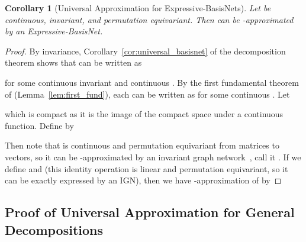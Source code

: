 \documentclass{article} \usepackage{iclr2023_conference,times}
\newtheorem{corollary}{Corollary}
\begin{document}
\begin{corollary}[Universal Approximation for Expressive-BasisNets]
    Let  be continuous,  invariant, and permutation equivariant. Then  can be -approximated by an Expressive-BasisNet.
\end{corollary}
\begin{proof}
    By invariance, Corollary~\ref{cor:universal_basisnet} of the decomposition theorem shows that  can be written as 
    
    for some continuous  invariant  and continuous . By the first fundamental theorem of  (Lemma~\ref{lem:first_fund}), each  can be written as  for some continuous . Let 
    
    which is compact as it is the image of the compact space  under a continuous function.
    Define  by 
    
    Then note that  is continuous and permutation equivariant from matrices to vectors, so it can be -approximated by an invariant graph network~\citep{keriven2019universal}, call it . If we define  and  (this identity operation is linear and permutation equivariant, so it can be exactly expressed by an IGN), then we have -approximation of  by 
    
\end{proof}


\subsection{Proof of Universal Approximation for General Decompositions}\label{appdx: Universal Approximation}
\end{document}
